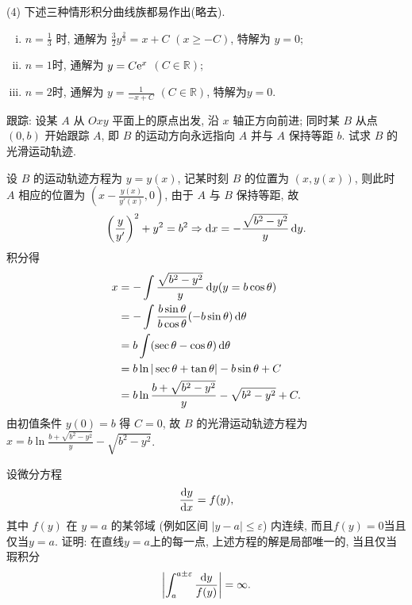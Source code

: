 \begin{solution}
  (4) 下述三种情形积分曲线族都易作出(略去).
  \begin{enumerate}[(i)]
  \item $n=\frac{1}{3}$ 时, 通解为 $\frac{3}{2}y^{\frac{2}{3}}=x+C$ $(x\geq-C)$, 特解为 $y=0$;
  \item $n=1$时, 通解为 $y=C\mathrm{e}^x$ $(C\in\mathbb{R})$;
  \item $n=2$时, 通解为 $y=\frac{1}{-x+C}$ $(C\in\mathbb{R})$, 特解为$y=0$.
  \end{enumerate}
\end{solution}



\begin{exercise}
  跟踪: 设某 $A$ 从 $Oxy$ 平面上的原点出发, 沿 $x$ 轴正方向前进; 同时某 $B$ 从点 $(0,b)$ 开始跟踪 $A$, 
  即 $B$ 的运动方向永远指向 $A$ 并与 $A$ 保持等距 $b$. 试求 $B$ 的光滑运动轨迹.
\end{exercise}

\begin{solution}
  设 $B$ 的运动轨迹方程为 $y=y(x)$, 记某时刻 $B$ 的位置为 $(x,y(x))$, 
  则此时 $A$ 相应的位置为 $\left(x-\frac{y(x)}{y'(x)},0\right)$, 由于 $A$ 与 $B$ 保持等距, 故
  \[\left(\frac{y}{y'}\right)^2+y^2=b^2\Rightarrow\mathop{}\!\mathrm{d} x=-\frac{\sqrt{b^2-y^2}}{y}\mathop{}\!\mathrm{d} y.\]
  积分得
  \[\begin{split}
  x
  & = -\int\frac{\sqrt{b^2-y^2}}{y}\mathop{}\!\mathrm{d} y(y=b\cos\theta) \\
  & = -\int\frac{b\sin\theta}{b\cos\theta}(-b\sin\theta)\mathop{}\!\mathrm{d}\theta \\
  & = b\int(\sec\theta-\cos\theta)\mathop{}\!\mathrm{d}\theta \\
  & = b\ln|\sec\theta+\tan\theta|-b\sin\theta+C \\
  & = b\ln\frac{b+\sqrt{b^2-y^2}}{y}-\sqrt{b^2-y^2}+C.
  \end{split}\]
  由初值条件 $y(0)=b$ 得 $C=0$, 故 $B$ 的光滑运动轨迹方程为
  $x=b\ln\frac{b+\sqrt{b^2-y^2}}{y}-\sqrt{b^2-y^2}$.
\end{solution}



\begin{exercise}
  设微分方程
  \[\frac{\mathop{}\!\mathrm{d} y}{\mathop{}\!\mathrm{d} x}=f(y),\]
  其中 $f(y)$ 在 $y=a$ 的某邻域 (例如区间 $|y-a|\leq\varepsilon$) 内连续, 而且$f(y)=0$当且仅当$y=a$. 
  证明: 在直线$y=a$上的每一点, 上述方程的解是局部唯一的, 当且仅当瑕积分
  \[\left|\int_a^{a\pm\varepsilon}\frac{\mathop{}\!\mathrm{d} y}{f(y)}\right|=\infty.\]
\end{exercise}

